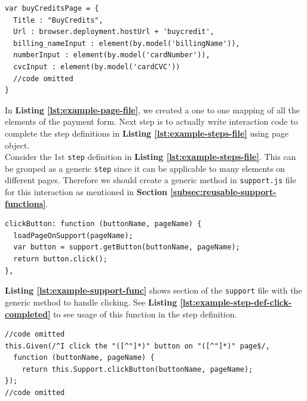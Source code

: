 \begin{listing}[H]
\begin{verbatim}
var buyCreditsPage = {
  Title : "BuyCredits",
  Url : browser.deployment.hostUrl + 'buycredit',
  billing_nameInput : element(by.model('billingName')),
  numberInput : element(by.model('cardNumber')),
  cvcInput : element(by.model('cardCVC'))
  //code omitted
}
\end{verbatim}
\label{lst:example-page-file}
\end{listing}

In \textbf{Listing \ref{lst:example-page-file}}, we created a one to one mapping of all the elements of the payment form. Next step is to actually write interaction code to complete the step definitions in \textbf{Listing \ref{lst:example-steps-file}} using page object.\\

Consider the 1st \texttt{step} definition in \textbf{Listing \ref{lst:example-steps-file}}. This can be grouped as a generic \texttt{step} since it can be applicable to many elements on different pages. Therefore we should create a generic method in \texttt{support.js} file for this interaction as mentioned in  \textbf{Section \ref{subsec:reusable-support-functions}}.

\begin{listing}[H]
\begin{verbatim}
clickButton: function (buttonName, pageName) {
  loadPageOnSupport(pageName);
  var button = support.getButton(buttonName, pageName);
  return button.click();
},
\end{verbatim}
\label{lst:example-support-func}
\end{listing}

\textbf{Listing \ref{lst:example-support-func}} shows section of the \texttt{support} file with the generic method to handle clicking. See \textbf{Listing \ref{lst:example-step-def-click-completed}} to see usage of this function in the step definition.

\begin{listing}[H]
\begin{verbatim}
//code omitted
this.Given(/^I click the "([^"]*)" button on "([^"]*)" page$/,
  function (buttonName, pageName) {
    return this.Support.clickButton(buttonName, pageName);
});
//code omitted
\end{verbatim}
\label{lst:example-step-def-click-completed}
\end{listing}

